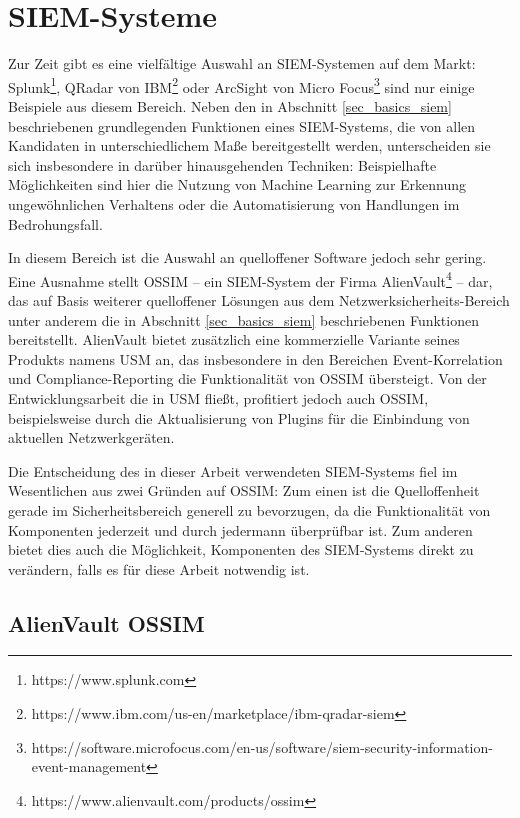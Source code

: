 \section{SIEM-Systeme}

\label{sec_state_siem}

Zur Zeit gibt es eine vielfältige Auswahl an SIEM-Systemen auf dem Markt: Splunk\footnote{
  https://www.splunk.com
}, QRadar von IBM\footnote{
  https://www.ibm.com/us-en/marketplace/ibm-qradar-siem
} oder ArcSight von Micro Focus\footnote{
  https://software.microfocus.com/en-us/software/siem-security-information-event-management
} sind nur einige Beispiele aus diesem Bereich. Neben den in Abschnitt \ref{sec_basics_siem} beschriebenen grundlegenden Funktionen eines SIEM-Systems, die von allen Kandidaten in unterschiedlichem Maße bereitgestellt werden, unterscheiden sie sich insbesondere in darüber hinausgehenden Techniken: Beispielhafte Möglichkeiten sind hier die Nutzung von Machine Learning zur Erkennung ungewöhnlichen Verhaltens oder die Automatisierung von Handlungen im Bedrohungsfall.

In diesem Bereich ist die Auswahl an quelloffener Software jedoch sehr gering. Eine Ausnahme stellt OSSIM -- ein SIEM-System der Firma AlienVault\footnote{
	https://www.alienvault.com/products/ossim
} -- dar, das auf Basis weiterer quelloffener Lösungen aus dem Netzwerksicherheits-Bereich unter anderem die in Abschnitt \ref{sec_basics_siem} beschriebenen Funktionen bereitstellt. AlienVault bietet zusätzlich eine kommerzielle Variante seines Produkts namens USM an, das insbesondere in den Bereichen Event-Korrelation und Compliance-Reporting die Funktionalität von OSSIM übersteigt. Von der Entwicklungsarbeit die in USM fließt, profitiert jedoch auch OSSIM, beispielsweise durch die Aktualisierung von Plugins für die Einbindung von aktuellen Netzwerkgeräten.

Die Entscheidung des in dieser Arbeit verwendeten SIEM-Systems fiel im Wesentlichen aus zwei Gründen auf OSSIM:
Zum einen ist die Quelloffenheit gerade im Sicherheitsbereich generell zu bevorzugen, da die Funktionalität von Komponenten jederzeit und durch jedermann überprüfbar ist. Zum anderen bietet dies auch die Möglichkeit, Komponenten des SIEM-Systems direkt zu verändern, falls es für diese Arbeit notwendig ist.

\subsection{AlienVault OSSIM}

